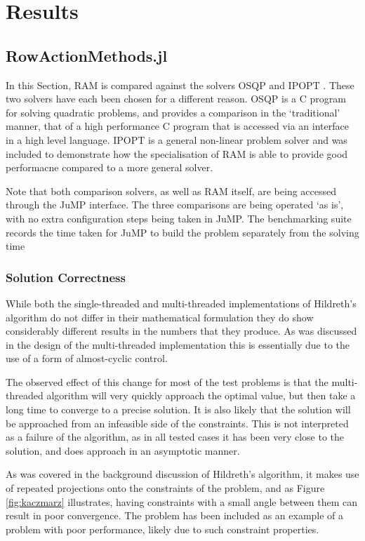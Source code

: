 \section{Results}\label{sec:results}

\subsection{RowActionMethods.jl}
In this Section, RAM is compared against the solvers OSQP \cite{Stellato2017OSQP:Programs} and IPOPT \cite{Wachter2006OnProgramming}. These two solvers have each been chosen for a different reason. OSQP is a C program for solving quadratic problems, and provides a comparison in the `traditional' manner, that of a high performance C program that is accessed via an interface in a high level language. IPOPT is a general non-linear problem solver and was included to demonstrate how the specialisation of RAM is able to provide good performacne compared to a more general solver.

Note that both comparison solvers, as well as RAM itself, are being accessed through the JuMP interface. The three comparisons are being operated `as is', with no extra configuration steps being taken in JuMP. The benchmarking suite records the time taken for JuMP to build the problem separately from the solving time 

\subsubsection{Solution Correctness}

While both the single-threaded and multi-threaded implementations of Hildreth's algorithm do not differ in their mathematical formulation they do show considerably different results in the numbers that they produce. As was discussed in the design of the multi-threaded implementation this is essentially due to the use of a form of almost-cyclic control.

The observed effect of this change for most of the test problems is that the multi-threaded algorithm will very quickly approach the optimal value, but then take a long time to converge to a precise solution. It is also likely that the solution will be approached from an infeasible side of the constraints. This is not interpreted as a failure of the algorithm, as in all tested cases it has been very close to the solution, and does approach in an asymptotic manner.

As was covered in the background discussion of Hildreth's algorithm, it makes use of repeated projections onto the constraints of the problem, and as Figure \ref{fig:kaczmarz} illustrates, having constraints with a small angle between them can result in poor convergence. The problem  has been included as an example of a problem with poor performance, likely due to such constraint properties.

